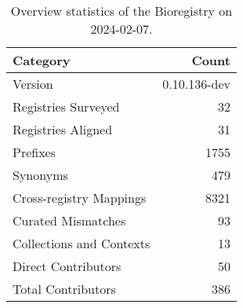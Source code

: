 \begin{table}
\caption{Overview statistics of the Bioregistry on 2024-02-07.}
\label{tab:bioregistry-summary}
\begin{tabular}{lr}
\toprule
Category & Count \\
\midrule
Version & 0.10.136-dev \\
Registries Surveyed & 32 \\
Registries Aligned & 31 \\
Prefixes & 1755 \\
Synonyms & 479 \\
Cross-registry Mappings & 8321 \\
Curated Mismatches & 93 \\
Collections and Contexts & 13 \\
Direct Contributors & 50 \\
Total Contributors & 386 \\
\bottomrule
\end{tabular}
\end{table}
